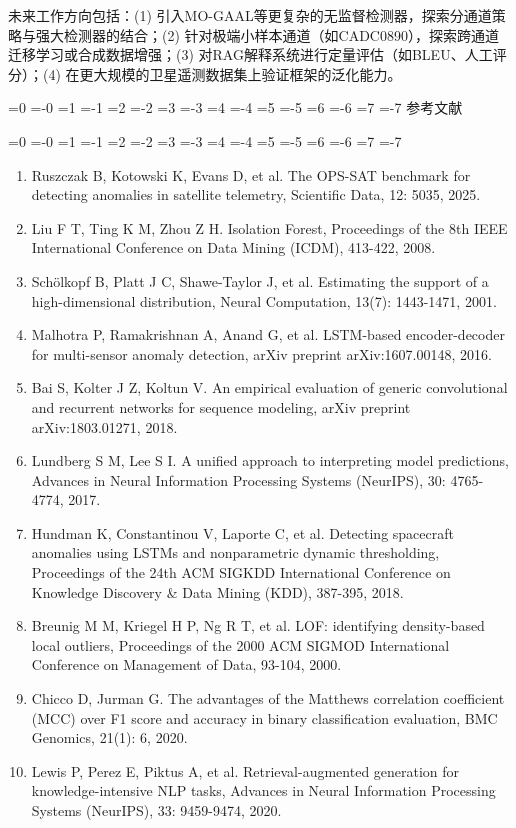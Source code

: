 \documentclass[12pt, a4paper]{article}
\newcommand{\zihao}[1]{%
    \ifnum#1=0 {\fontsize{42pt}{50pt}\selectfont}%
    \else\ifnum#1=-0 {\fontsize{36pt}{44pt}\selectfont}%
    \else\ifnum#1=1 {\fontsize{26pt}{32pt}\selectfont}%
    \else\ifnum#1=-1 {\fontsize{24pt}{28pt}\selectfont}%
    \else\ifnum#1=2 {\fontsize{22pt}{26pt}\selectfont}%
    \else\ifnum#1=-2 {\fontsize{18pt}{22pt}\selectfont}%
    \else\ifnum#1=3 {\fontsize{16pt}{20pt}\selectfont}%
    \else\ifnum#1=-3 {\fontsize{15pt}{18pt}\selectfont}%
    \else\ifnum#1=4 {\fontsize{14pt}{17pt}\selectfont}%
    \else\ifnum#1=-4 {\fontsize{12pt}{15pt}\selectfont}%
    \else\ifnum#1=5 {\fontsize{10.5pt}{13pt}\selectfont}%
    \else\ifnum#1=-5 {\fontsize{9pt}{11pt}\selectfont}%
    \else\ifnum#1=6 {\fontsize{7.5pt}{9pt}\selectfont}%
    \else\ifnum#1=-6 {\fontsize{6.5pt}{8pt}\selectfont}%
    \else\ifnum#1=7 {\fontsize{5.5pt}{7pt}\selectfont}%
    \else\ifnum#1=-7 {\fontsize{5pt}{6pt}\selectfont}%
    \fi\fi\fi\fi\fi\fi\fi\fi\fi\fi\fi\fi\fi\fi\fi\fi
}
\newcommand{\heiti}{\CJKfontspec{SimHei}}
\newcommand{\songti}{\CJKfontspec{SimSun}}
\begin{document}
未来工作方向包括：(1) 引入MO-GAAL等更复杂的无监督检测器，探索分通道策略与强大检测器的结合；(2) 针对极端小样本通道（如CADC0890），探索跨通道迁移学习或合成数据增强；(3) 对RAG解释系统进行定量评估（如BLEU、人工评分）；(4) 在更大规模的卫星遥测数据集上验证框架的泛化能力。

\newpage
\begin{center}
\zihao{4}\heiti 参考文献
\end{center}

\zihao{5}\songti
\begin{enumerate}
    \item Ruszczak B, Kotowski K, Evans D, et al. The OPS-SAT benchmark for detecting anomalies in satellite telemetry, Scientific Data, 12: 5035, 2025.
    \item Liu F T, Ting K M, Zhou Z H. Isolation Forest, Proceedings of the 8th IEEE International Conference on Data Mining (ICDM), 413-422, 2008.
    \item Sch{\"o}lkopf B, Platt J C, Shawe-Taylor J, et al. Estimating the support of a high-dimensional distribution, Neural Computation, 13(7): 1443-1471, 2001.
    \item Malhotra P, Ramakrishnan A, Anand G, et al. LSTM-based encoder-decoder for multi-sensor anomaly detection, arXiv preprint arXiv:1607.00148, 2016.
    \item Bai S, Kolter J Z, Koltun V. An empirical evaluation of generic convolutional and recurrent networks for sequence modeling, arXiv preprint arXiv:1803.01271, 2018.
    \item Lundberg S M, Lee S I. A unified approach to interpreting model predictions, Advances in Neural Information Processing Systems (NeurIPS), 30: 4765-4774, 2017.
    \item Hundman K, Constantinou V, Laporte C, et al. Detecting spacecraft anomalies using LSTMs and nonparametric dynamic thresholding, Proceedings of the 24th ACM SIGKDD International Conference on Knowledge Discovery \& Data Mining (KDD), 387-395, 2018.
    \item Breunig M M, Kriegel H P, Ng R T, et al. LOF: identifying density-based local outliers, Proceedings of the 2000 ACM SIGMOD International Conference on Management of Data, 93-104, 2000.
    \item Chicco D, Jurman G. The advantages of the Matthews correlation coefficient (MCC) over F1 score and accuracy in binary classification evaluation, BMC Genomics, 21(1): 6, 2020.
    \item Lewis P, Perez E, Piktus A, et al. Retrieval-augmented generation for knowledge-intensive NLP tasks, Advances in Neural Information Processing Systems (NeurIPS), 33: 9459-9474, 2020.

\end{enumerate}
\end{document}
